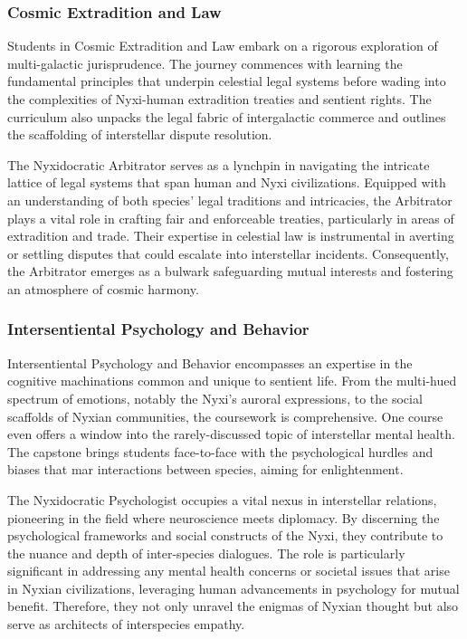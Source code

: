 \subsubsection{Cosmic Extradition and Law}
Students in Cosmic Extradition and Law embark on a rigorous exploration of
multi-galactic jurisprudence. The journey commences with learning the
fundamental principles that underpin celestial legal systems before wading into
the complexities of Nyxi-human extradition treaties and sentient rights. The
curriculum also unpacks the legal fabric of intergalactic commerce and outlines
the scaffolding of interstellar dispute resolution.

The Nyxidocratic Arbitrator serves as a lynchpin in navigating the intricate
lattice of legal systems that span human and Nyxi civilizations. Equipped with
an understanding of both species' legal traditions and intricacies, the
Arbitrator plays a vital role in crafting fair and enforceable treaties,
particularly in areas of extradition and trade. Their expertise in celestial
law is instrumental in averting or settling disputes that could escalate into
interstellar incidents. Consequently, the Arbitrator emerges as a bulwark
safeguarding mutual interests and fostering an atmosphere of cosmic harmony.

\subsubsection{Intersentiental Psychology and Behavior}
Intersentiental Psychology and Behavior encompasses an expertise in the
cognitive machinations common and unique to sentient life. From the multi-hued
spectrum of emotions, notably the Nyxi's auroral expressions, to the social
scaffolds of Nyxian communities, the coursework is comprehensive. One course
even offers a window into the rarely-discussed topic of interstellar mental
health. The capstone brings students face-to-face with the psychological
hurdles and biases that mar interactions between species, aiming for
enlightenment.

The Nyxidocratic Psychologist occupies a vital nexus in interstellar relations,
pioneering in the field where neuroscience meets diplomacy. By discerning the
psychological frameworks and social constructs of the Nyxi, they contribute to
the nuance and depth of inter-species dialogues. The role is particularly
significant in addressing any mental health concerns or societal issues that
arise in Nyxian civilizations, leveraging human advancements in psychology for
mutual benefit. Therefore, they not only unravel the enigmas of Nyxian thought
but also serve as architects of interspecies empathy.

